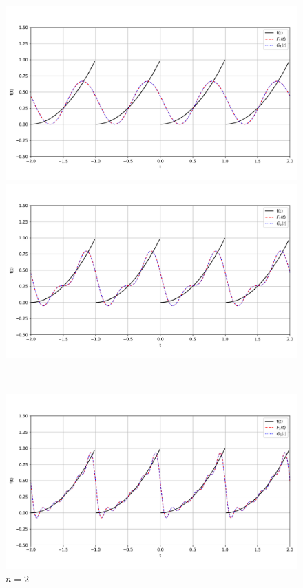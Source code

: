 \documentclass[a4paper]{article}
\begin{document}
\begin{figure}[H]
    \begin{minipage}{0.5\textwidth}
        \centering \includegraphics[width=\textwidth]{periodic_func/1.png}
        \caption{$n = 1$}
    \end{minipage}\hfill
    \begin{minipage}{0.5\textwidth}
        \centering \includegraphics[width=\textwidth]{periodic_func/2.png}
        \caption{$n = 2$}
    \end{minipage}\\[2em]
    \begin{minipage}{0.5\textwidth}
        \centering \includegraphics[width=\textwidth]{periodic_func/5.png}

\end{minipage}
\end{figure}
\end{document}
